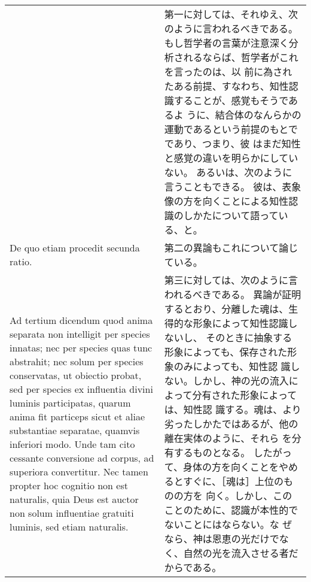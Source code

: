 \documentclass[10pt]{jsarticle} %
\begin{document}
\begin{longtable}{p{21em}p{21em}}
&

第一に対しては、それゆえ、次のように言われるべきである。
もし哲学者の言葉が注意深く分析されるならば、哲学者がこれを言ったのは、以
 前に為されたある前提、すなわち、知性認識することが、感覚もそうであるよ
 うに、結合体のなんらかの運動であるという前提のもとでであり、つまり、彼
 はまだ知性と感覚の違いを明らかにしていない。
あるいは、次のように言うこともできる。
彼は、表象像の方を向くことによる知性認識のしかたについて語っている、と。

\\



De quo etiam procedit secunda ratio.


&

第二の異論もこれについて論じている。

\\



Ad tertium dicendum quod anima separata non
 intelligit per species innatas; nec per species quas tunc abstrahit;
 nec solum per species conservatas, ut obiectio probat, sed per species
 ex influentia divini luminis participatas, quarum anima fit particeps
 sicut et aliae substantiae separatae, quamvis inferiori modo. Unde tam
 cito cessante conversione ad corpus, ad superiora convertitur. Nec
 tamen propter hoc cognitio non est naturalis, quia Deus est auctor non
 solum influentiae gratuiti luminis, sed etiam naturalis.


&

第三に対しては、次のように言われるべきである。
異論が証明するとおり、分離した魂は、生得的な形象によって知性認識しないし、
 そのときに抽象する形象によっても、保存された形象のみによっても、知性認
 識しない。しかし、神の光の流入によって分有された形象によっては、知性認
 識する。魂は、より劣ったしかたではあるが、他の離在実体のように、それら
 を分有するものとなる。
したがって、身体の方を向くことをやめるとすぐに、［魂は］上位のものの方を
 向く。しかし、このことのために、認識が本性的でないことにはならない。な
 ぜなら、神は恩恵の光だけでなく、自然の光を流入させる者だからである。


\end{longtable}
%
%
%
\end{document}
